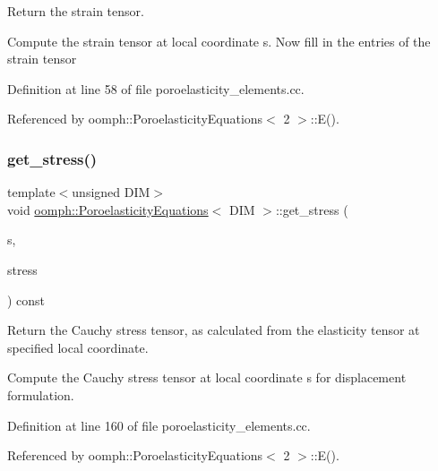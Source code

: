 Return the strain tensor. 

Compute the strain tensor at local coordinate s. Now fill in the entries of the strain tensor 

Definition at line 58 of file poroelasticity\+\_\+elements.\+cc.



Referenced by oomph\+::\+Poroelasticity\+Equations$<$ 2 $>$\+::\+E().

\mbox{\label{classoomph_1_1PoroelasticityEquations_a4f8cb984e4afa174beca76989299f256}} 
\subsubsection{\texorpdfstring{get\+\_\+stress()}{get\_stress()}}
{\footnotesize\ttfamily template$<$unsigned D\+IM$>$ \\
void \hyperlink{classoomph_1_1PoroelasticityEquations}{oomph\+::\+Poroelasticity\+Equations}$<$ D\+IM $>$\+::get\+\_\+stress (\begin{DoxyParamCaption}\item[{const \hyperlink{classoomph_1_1Vector}{Vector}$<$ double $>$ \&}]{s,  }\item[{\hyperlink{classoomph_1_1DenseMatrix}{Dense\+Matrix}$<$ double $>$ \&}]{stress }\end{DoxyParamCaption}) const}



Return the Cauchy stress tensor, as calculated from the elasticity tensor at specified local coordinate. 

Compute the Cauchy stress tensor at local coordinate s for displacement formulation. 

Definition at line 160 of file poroelasticity\+\_\+elements.\+cc.



Referenced by oomph\+::\+Poroelasticity\+Equations$<$ 2 $>$\+::\+E().

\mbox{\label{classoomph_1_1PoroelasticityEquations_ad391ac29fbda008d06f6c97330cf0bad}} 
